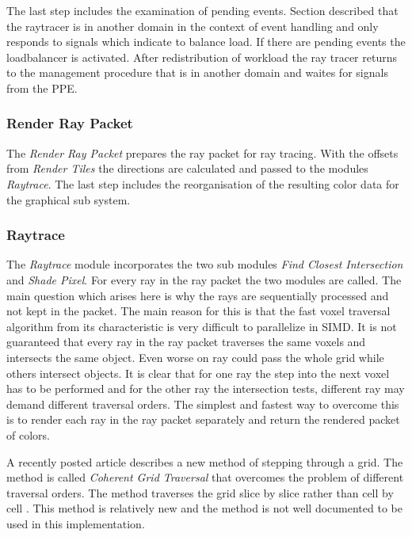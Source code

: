 \documentclass[DIV10, abstracton, openright, footsepline, headsepline, twoside, 9pt,
bigheadings]{scrreprt}
\begin{document}
The last step includes the examination of pending events.
Section \label{sec:design_event_handling} described that the raytracer is in
another domain in the context of event handling and only responds to signals
which indicate to balance load. If there are pending events the loadbalancer is
activated. After redistribution of workload the ray tracer returns to the management
procedure that is in another domain and waites for signals from the PPE.

\subsubsection{Render Ray Packet}
\label{sec:design_render_ray_packet}
The \textit{Render Ray Packet} prepares the ray packet for ray tracing. With
the offsets from \textit{Render Tiles} the directions are calculated and passed
to the modules \textit{Raytrace}. The last step includes the reorganisation
of the resulting color data for the graphical sub system.


\subsubsection{Raytrace}
\label{sec:design_raytrace}
The \textit{Raytrace} module incorporates the two sub modules \textit{Find Closest
Intersection} and \textit{Shade Pixel}. For every ray in the ray packet the two
modules are called. The main question which arises here is why the rays are
sequentially processed and not kept in the packet. The main reason for this
is that the fast voxel traversal algorithm from its characteristic is very difficult
to parallelize in SIMD. It is not guaranteed that every ray in the ray packet
traverses the same voxels and intersects the same object. Even worse on ray could
pass the whole grid while others intersect objects. It is clear that for one ray
the step into the next voxel has to be performed and for the other ray the
intersection tests, different ray may demand different traversal orders.  The
simplest and fastest way to overcome this is to render each ray in the ray packet
separately and return the rendered packet of colors.

A recently posted article describes a new method of stepping through a grid. The
method is called \textit{Coherent Grid Traversal} that overcomes the problem
of different traversal orders. The method traverses the grid slice by slice rather
than cell by cell \cite{Wald06Grid}. This method is relatively new and the
method is not well documented to be used in this implementation.
\end{document}
